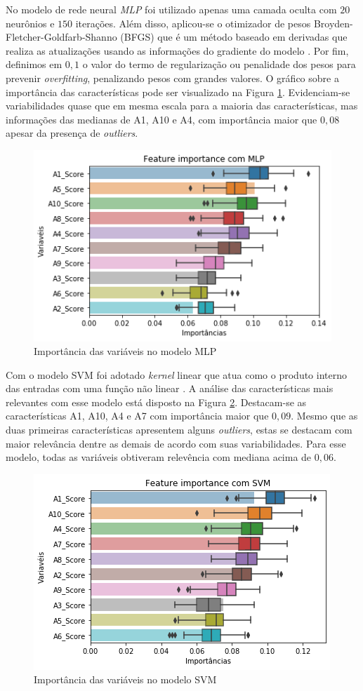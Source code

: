 \documentclass{template/sig-alternate-05-2015}
\begin{document}
    No modelo de rede neural \emph{MLP} foi utilizado apenas uma
    camada oculta com $20$ neurônios e $150$ iterações. Além disso,
    aplicou-se o otimizador de pesos Broyden-Fletcher-Goldfarb-Shanno
    (BFGS) que é um método baseado em derivadas que realiza as
    atualizações usando as informações do gradiente do modelo
    \cite{Maciel:2016}. Por fim, definimos em $0,1$ o valor do termo
    de regularização ou penalidade dos pesos para prevenir
    \textit{overfitting}, penalizando pesos com grandes valores. O
    gráfico sobre a importância das características pode ser
    visualizado na Figura \ref{fig:mlp}. Evidenciam-se variabilidades
    quase que em mesma escala para a maioria das características, mas
    informações das medianas de A1, A10 e A4, com importância maior
    que $0,08$ apesar da presença de \textit{outliers}.

    \begin{figure}[!h]
      \centering
      \includegraphics[width=.5\textwidth]{imagens/box_mlp.png}
      \caption{Importância das variáveis no modelo MLP}
      \label{fig:mlp}
    \end{figure}

    Com o modelo SVM foi adotado \textit{kernel} linear que atua como
    o produto interno das entradas com uma função não linear
    \cite{samsudin2010hybrid}. A análise das características mais
    relevantes com esse modelo está disposto na Figura
    \ref{fig:svm}. Destacam-se as características A1, A10, A4 e A7 com
    importância maior que $0,09$. Mesmo que as duas primeiras
    características apresentem alguns \textit{outliers}, estas se
    destacam com maior relevância dentre as demais de acordo com suas
    variabilidades. Para esse modelo, todas as variáveis obtiveram
    relevência com mediana acima de $0,06$.

    \begin{figure}[!h]
      \centering
      \includegraphics[width=.5\textwidth]{imagens/box_svm.png}
      \caption{Importância das variáveis no modelo SVM}
      \label{fig:svm}
    \end{figure}
\end{document}
